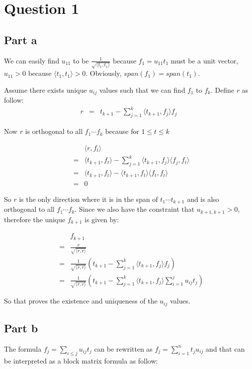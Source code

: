 \section*{Question 1}
\subsection*{Part a}
We can easily find $ u_{11} $ to be $ \frac{1}{\sqrt{\langle t_1, t_1 \rangle}} $ because $ f_1 = u_{11}t_1 $ must be a unit vector, $ u_{11} > 0 $ because $ \langle t_1, t_1 \rangle > 0 $. Obviously, $ span(f_1) = span(t_1) $.

Assume there exists unique $ u_{ij} $ values such that we can find $ f_1 $ to $ f_k $. Define $ r $ as follow:
\begin{eqnarray*}
  r &=& t_{k+1} - \sum\limits_{j=1}^{k} \langle t_{k+1}, f_j \rangle f_j
\end{eqnarray*}

Now $ r $ is orthogonal to all $ f_1 \cdots f_k $ because for $ 1 \le t \le k $

\begin{eqnarray*}
  & & \langle r, f_t \rangle \\
  &=& \langle t_{k+1}, f_t \rangle - \sum\limits_{j=1}^{k} \langle t_{k+1}, f_j \rangle \langle f_j, f_t \rangle \\
  &=& \langle t_{k+1}, f_t \rangle -  \langle t_{k+1}, f_t \rangle \langle f_t, f_t \rangle \\
  &=& 0
\end{eqnarray*}

So $ r $ is the only direction where it is in the span of $ t_1 \cdots t_{k+1} $ and is also orthogonal to all $ f_1 \cdots f_k $. Since we also have the constraint that $ u_{k+1, k+1} > 0$, therefore the unique $ f_{k+1} $ is given by:

\begin{eqnarray*}
  & & f_{k+1} \\
  &=& \frac{r}{\sqrt{\langle r, r \rangle}} \\
  &=& \frac{1}{\sqrt{\langle r, r \rangle}}(t_{k+1} - \sum\limits_{j=1}^{k} \langle t_{k+1}, f_j \rangle f_j) \\
  &=& \frac{1}{\sqrt{\langle r, r \rangle}}(t_{k+1} - \sum\limits_{j=1}^{k} \langle t_{k+1}, f_j \rangle \sum\limits_{i=1}^{j}u_{ij} t_j)
\end{eqnarray*}

So that proves the existence and uniqueness of the $ u_{ij} $ values.
\subsection*{Part b}
The formula $ f_j = \sum\limits_{i \le j} u_{ij} t_j $ can be rewritten as $ f_j = \sum\limits_{i = 1}^n  t_j u_{ij} $ and that can be interpreted as a block matrix formula as follow:

